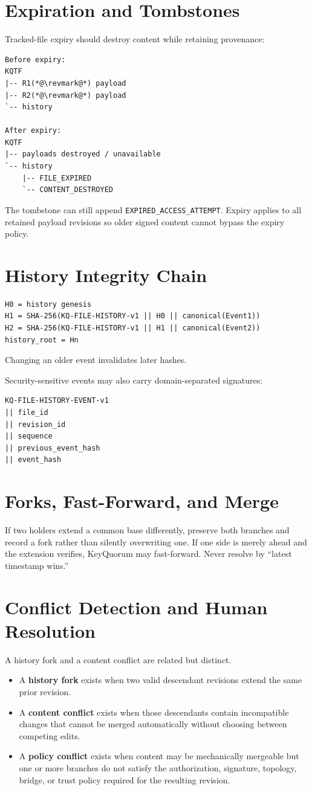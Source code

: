 \documentclass[11pt]{article}
\begin{document}
\section{Expiration and Tombstones}
Tracked-file expiry should destroy content while retaining provenance:
\begin{lstlisting}
Before expiry:
KQTF
|-- R1(*@\revmark@*) payload
|-- R2(*@\revmark@*) payload
`-- history

After expiry:
KQTF
|-- payloads destroyed / unavailable
`-- history
    |-- FILE_EXPIRED
    `-- CONTENT_DESTROYED
\end{lstlisting}
The tombstone can still append \texttt{EXPIRED\_ACCESS\_ATTEMPT}. Expiry applies to all retained payload revisions so older signed content cannot bypass the expiry policy.

\section{History Integrity Chain}
\begin{lstlisting}
H0 = history genesis
H1 = SHA-256(KQ-FILE-HISTORY-v1 || H0 || canonical(Event1))
H2 = SHA-256(KQ-FILE-HISTORY-v1 || H1 || canonical(Event2))
history_root = Hn
\end{lstlisting}
Changing an older event invalidates later hashes.

Security-sensitive events may also carry domain-separated signatures:
\begin{lstlisting}
KQ-FILE-HISTORY-EVENT-v1
|| file_id
|| revision_id
|| sequence
|| previous_event_hash
|| event_hash
\end{lstlisting}

\section{Forks, Fast-Forward, and Merge}
If two holders extend a common base differently, preserve both branches and record a fork rather than silently overwriting one. If one side is merely ahead and the extension verifies, KeyQuorum may fast-forward. Never resolve by ``latest timestamp wins.''


\section{Conflict Detection and Human Resolution}

A history fork and a content conflict are related but distinct.

\begin{itemize}[leftmargin=1.5em]
  \item A \textbf{history fork} exists when two valid descendant revisions extend the same prior revision.
  \item A \textbf{content conflict} exists when those descendants contain incompatible changes that cannot be merged automatically without choosing between competing edits.
  \item A \textbf{policy conflict} exists when content may be mechanically mergeable but one or more branches do not satisfy the authorization, signature, topology, bridge, or trust policy required for the resulting revision.
\end{itemize}
\end{document}
